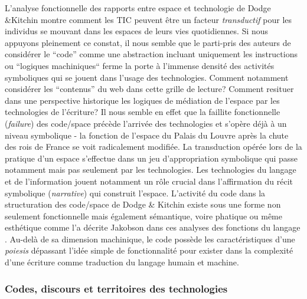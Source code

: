 L’analyse fonctionnelle des rapports entre espace et technologie de Dodge \&Kitchin montre comment les TIC peuvent être un facteur \textit{transductif} pour les individus se mouvant dans les espaces de leurs vies quotidiennes. Si nous appuyons pleinement ce constat, il nous semble que le parti-pris des auteurs de considérer le “code” comme une abstraction incluant uniquement les instructions ou “logiques machiniques“ ferme la porte à l’immense densité des activités symboliques qui se jouent dans l’usage des technologies. Comment notamment considérer les “contenus” du web dans cette grille de lecture? Comment resituer dans une perspective historique les logiques de médiation de l’espace par les technologies de l’écriture? Il nous semble en effet que la faillite fonctionnelle (\textit{failure}) des code/space précède l’arrivée des technologies et s’opère déjà à un niveau symbolique - la fonction de l’espace du Palais du Louvre après la chute des rois de France se voit radicalement modifiée. La transduction opérée lors de la pratique d’un espace s’effectue dans un jeu d’appropriation symbolique qui passe notamment mais pas seulement par les technologies. Les technologies du langage et de l’information jouent notamment un rôle crucial dans l’affirmation du récit symbolique (\textit{narrative}) qui construit l’espace. L’activité du code dans la structuration des code/space de Dodge \&  Kitchin existe sous une forme non seulement fonctionnelle mais également sémantique, voire phatique ou même esthétique comme l’a décrite Jakobson dans ces analyses des fonctions du langage \citep{Jakobson1956}. Au-delà de sa dimension machinique, le code possède les caractéristiques d’une \textit{poiesis} dépassant l’idée simple de fonctionnalité pour exister dans la complexité d’une écriture comme traduction du langage humain et machine.

\subsubsection[Codes, discours et territoires des technologies]{Codes, discours et territoires des technologies}

